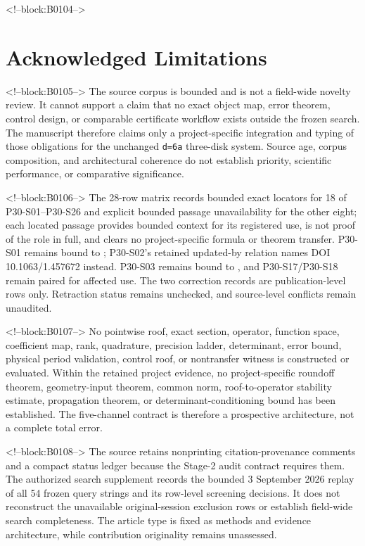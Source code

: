 \documentclass[11pt,a4paper]{article}
\begin{document}
<!--block:B0104-->
\section{Acknowledged Limitations}

<!--block:B0105-->
The source corpus is bounded and is not a field-wide novelty review. It cannot support a claim that no exact object map, error theorem, control design, or comparable certificate workflow exists outside the frozen search. The manuscript therefore claims only a project-specific integration and typing of those obligations for the unchanged \texttt{d=6a} three-disk system. Source age, corpus composition, and architectural coherence do not establish priority, scientific performance, or comparative significance.

<!--block:B0106-->
The 28-row matrix records bounded exact locators for 18 of
P30-S01--P30-S26 and explicit bounded passage unavailability for the other eight;
each located passage provides bounded context for its registered use, is not
proof of the role in full, and clears no project-specific formula or theorem
transfer. P30-S01 remains bound to \citep{P30-C01}; P30-S02's retained
updated-by relation names DOI 10.1063/1.457672 instead. P30-S03 remains bound
to \citep{P30-C02}, and P30-S17/P30-S18 remain paired for affected use.
The two correction records are publication-level rows only. Retraction status
remains unchecked, and source-level conflicts remain unaudited.

<!--block:B0107-->
No pointwise roof, exact section, operator, function space, coefficient map, rank, quadrature, precision ladder, determinant, error bound, physical period validation, control roof, or nontransfer witness is constructed or evaluated. Within the retained project evidence, no project-specific roundoff theorem, geometry-input theorem, common norm, roof-to-operator stability estimate, propagation theorem, or determinant-conditioning bound has been established. The five-channel contract is therefore a prospective architecture, not a complete total error.

<!--block:B0108-->
The source retains nonprinting citation-provenance comments and a compact status ledger because the Stage-2 audit contract requires them. The authorized search supplement records the bounded 3 September 2026 replay of all 54 frozen query strings and its row-level screening decisions. It does not reconstruct the unavailable original-session exclusion rows or establish field-wide search completeness. The article type is fixed as methods and evidence architecture, while contribution originality remains unassessed.
\end{document}
